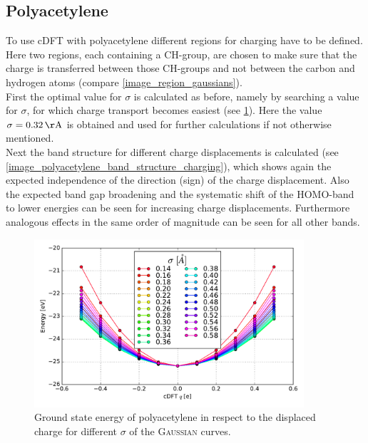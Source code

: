 \subsection{Polyacetylene}
To use cDFT with polyacetylene different regions for charging have to be defined. Here two regions, each containing a CH-group, are chosen to make sure that the charge is transferred between those CH-groups and not between the carbon and hydrogen atoms (compare \cref{image_region_gaussians}).\\
First the optimal value for $\sigma$ is calculated as before, namely by searching a value for $\sigma$, for which charge transport becomes easiest (see \cref{image_sigmas_polyacetylene}). Here the value $\sigma = \unit[0.32]{\AA}$ is obtained and used for further calculations if not otherwise mentioned.\\
Next the band structure for different charge displacements is calculated (see \cref{image_polyacetylene_band_structure_charging}), which shows again the expected independence of the direction (sign) of the charge displacement. Also the expected band gap broadening and the systematic shift of the HOMO-band to lower energies can be seen for increasing charge displacements. Furthermore analogous effects in the same order of magnitude can be seen for all other bands.
\begin{figure}
	\centering
	\includegraphics[width = 10cm]{Images/polyacetylene/charging/sigmas}
	\caption{Ground state energy of polyacetylene in respect to the displaced charge for different $\sigma$ of the \textsc{Gaussian} curves.}
	\label{image_sigmas_polyacetylene}
\end{figure}
